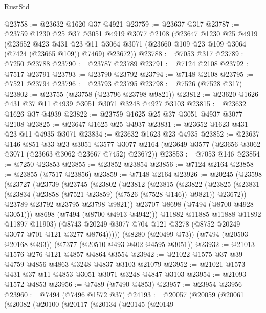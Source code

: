 \begin{lexlean}{RustStd}
\begin{coremodule}
@23758 := @23632 @1620 @37 @4921
@23759 := @23637 @317
@23787 := @23759
    @1230
    @25
    @37
    @3051
    @4919
    @3077
    @2108
    (@23647
      @1230
      @25
      @4919
      (@23652
        @423
        @431
        @23
        @11
        @3064
        @3071
        (@23660 @109 @23 @109 @3064 (@7424 (@23665 @109)) @7469)
        @23672))
@23788 := @7053 @317
@23789 := @7250 @23788
@23790 := @23787 @23789
@23791 := @7124 @2108
@23792 := @7517 @23791
@23793 := @23790 @23792
@23794 := @7148 @2108
@23795 := @7521 @23794
@23796 := @23793 @23795
@23798 := @7526 (@7528 @317)
@23802 := @23755 (@23758 (@23796 @23798 @9821))
@23812 := @23620 @1626 @431 @37 @11 @4939 @3051 @3071 @3248 @4927 @3103
@23815 := @23632 @1626 @37 @4939
@23822 := @23759 @1625 @25 @37 @3051 @4937 @3077 @2108
@23825 := @23647 @1625 @25 @4937
@23831 := @23652 @1623 @431 @23 @11 @4935 @3071
@23834 := @23632 @1623 @23 @4935
@23852 := @23637
    @146
    @851
    @33
    @23
    @3051
    @3577
    @3077
    @2164
    (@23649 @3577 (@23656 @3062 @3071 (@23663 @3062 @23667 @7452) @23672))
@23853 := @7053 @146
@23854 := @7250 @23853
@23855 := @23852 @23854
@23856 := @7124 @2164
@23858 := @23855 (@7517 @23856)
@23859 := @7148 @2164
@23926 := @20245
    (@23598
      (@23727
        (@23739
          (@23745
            (@23802
              (@23812
                (@23815
                  (@23822
                    (@23825
                      (@23831 (@23834 (@23858 (@7521 @23859) (@7526 (@7528 @146)) @9821)) @23672))
                    @23789
                    @23792
                    @23795
                    @23798
                    @9821))
                @23707
                @8698
                (@7494 (@8700 @4928 @3051)))
              @8698
              (@7494 (@8700 @4913 @4942)))
            @11882
            @11885
            @11888
            @11892
            @11897
            @11903)
          (@8743 @20249 @3077 @704 @121 @3278 (@8752 @20249 @3077 @701 @121 @3277 @8764)))))
    (@8280 (@20499 @73))
    (@7494 (@20503 @20168 @493))
    (@7377 (@20510 @493 @402 @4595 @3051))
@23932 := @21013 @1576 @276 @121 @4857 @4864 @3554
@23942 := @21022 @1575 @37 @39 @4759 @4856 @4863 @3248 @4837 @3103 @21079
@23952 := @21021 @1573 @431 @37 @11 @4853 @3051 @3071 @3248 @4847 @3103
@23954 := @21093 @1572 @4853
@23956 := @7489 (@7490 @4853)
@23957 := @23954 @23956
@23960 := @7494 (@7496 @1572 @37)
@24193 := @20057
    (@20059
      (@20061
        (@20082
          (@20100
            (@20117
              (@20134
                (@20145
                  (@20149

\end{coremodule}
\end{lexlean}
